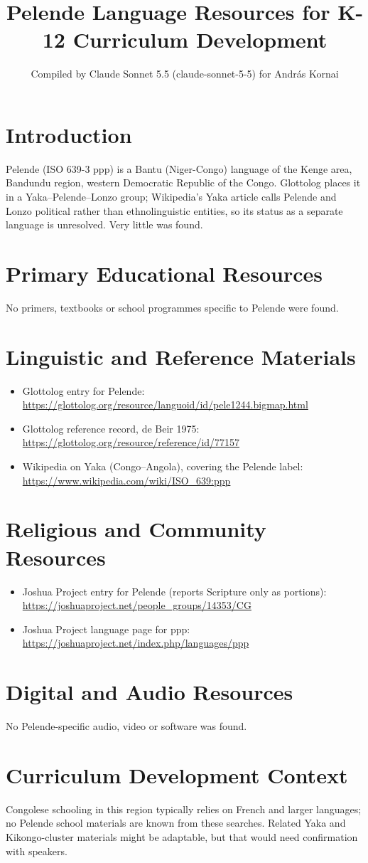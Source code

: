 \documentclass[12pt]{article}
\title{Pelende Language Resources for K-12 Curriculum Development}
\author{Compiled by Claude Sonnet 5.5 (claude-sonnet-5-5) for Andr\'as Kornai}
\date{}
\begin{document}
\maketitle

\section{Introduction}
Pelende (ISO 639-3 ppp) is a Bantu (Niger-Congo) language of the Kenge area, Bandundu region, western Democratic Republic of the Congo. Glottolog places it in a Yaka--Pelende--Lonzo group; Wikipedia's Yaka article calls Pelende and Lonzo political rather than ethnolinguistic entities, so its status as a separate language is unresolved. Very little was found.

\section{Primary Educational Resources}
No primers, textbooks or school programmes specific to Pelende were found.

\section{Linguistic and Reference Materials}
\begin{itemize}
\item Glottolog entry for Pelende: \url{https://glottolog.org/resource/languoid/id/pele1244.bigmap.html}
\item Glottolog reference record, de Beir 1975: \url{https://glottolog.org/resource/reference/id/77157}
\item Wikipedia on Yaka (Congo--Angola), covering the Pelende label: \url{https://www.wikipedia.com/wiki/ISO_639:ppp}
\end{itemize}

\section{Religious and Community Resources}
\begin{itemize}
\item Joshua Project entry for Pelende (reports Scripture only as portions): \url{https://joshuaproject.net/people_groups/14353/CG}
\item Joshua Project language page for ppp: \url{https://joshuaproject.net/index.php/languages/ppp}
\end{itemize}

\section{Digital and Audio Resources}
No Pelende-specific audio, video or software was found.

\section{Curriculum Development Context}
Congolese schooling in this region typically relies on French and larger languages; no Pelende school materials are known from these searches. Related Yaka and Kikongo-cluster materials might be adaptable, but that would need confirmation with speakers.
\end{document}
